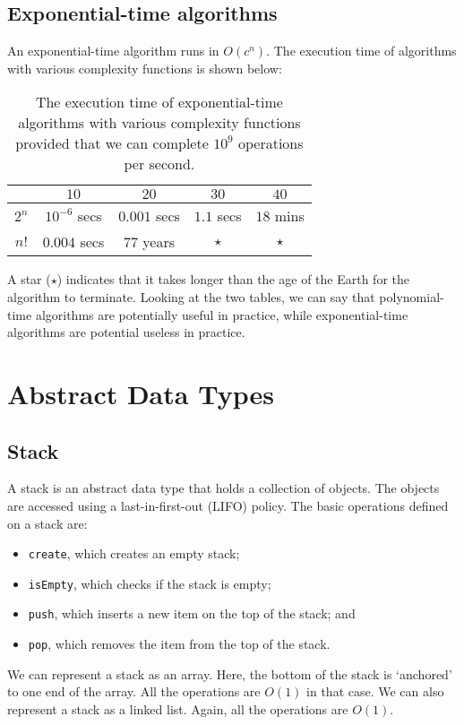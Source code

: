 \documentclass[a4paper, openany]{memoir}
\begin{document}
\subsection{Exponential-time algorithms}
An exponential-time algorithm runs in $O(c^n)$. The execution time of algorithms with various complexity functions is shown below:
\begin{table}[H]
    \centering
    \begin{tabular}{|c|c|c|c|c|}
        \hline
         & $10$ & $20$ & $30$ & $40$ \\
        \hline
        $2^n$ & $10^{-6}$ secs & $0.001$ secs & $1.1$ secs & $18$ mins \\
        \hline
        $n!$ & $0.004$ secs & $77$ years & $\star$ & $\star$ \\
        \hline
    \end{tabular}
    \caption{The execution time of exponential-time algorithms with various complexity functions provided that we can complete $10^9$ operations per second.}
\end{table}
A star ($\star$) indicates that it takes longer than the age of the Earth for the algorithm to terminate. Looking at the two tables, we can say that polynomial-time algorithms are potentially useful in practice, while exponential-time algorithms are potential useless in practice.
\newpage

\section{Abstract Data Types}
\subsection{Stack}
A stack is an abstract data type that holds a collection of objects. The objects are accessed using a last-in-first-out (LIFO) policy. The basic operations defined on a stack are:
\begin{itemize}
    \item \texttt{create}, which creates an empty stack;
    \item \texttt{isEmpty}, which checks if the stack is empty;
    \item \texttt{push}, which inserts a new item on the top of the stack; and
    \item \texttt{pop}, which removes the item from the top of the stack.
\end{itemize}
We can represent a stack as an array. Here, the bottom of the stack is `anchored' to one end of the array. All the operations are $O(1)$ in that case. We can also represent a stack as a linked list. Again, all the operations are $O(1)$.
\end{document}
